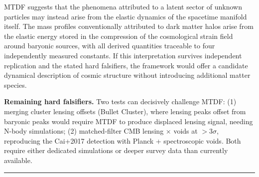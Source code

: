 \documentclass[11pt,a4paper]{article}
\begin{document}
MTDF suggests that the phenomena attributed to a latent sector of unknown particles may instead arise from the elastic dynamics of the spacetime manifold itself. The mass profiles conventionally attributed to dark matter halos arise from the elastic energy stored in the compression of the cosmological strain field around baryonic sources, with all derived quantities traceable to four independently measured constants. If this interpretation survives independent replication and the stated hard falsifiers, the framework would offer a candidate dynamical description of cosmic structure without introducing additional matter species.

\begin{mdframed}[linecolor=accent,linewidth=0.5pt,backgroundcolor=callout-bg,leftline=true,rightline=true,topline=true,bottomline=true,innerleftmargin=8pt,innerrightmargin=8pt,innertopmargin=6pt,innerbottommargin=6pt]
\textbf{Remaining hard falsifiers.} Two tests can decisively challenge MTDF: (1) merging cluster lensing offsets (Bullet Cluster), where lensing peaks offset from baryonic peaks would require MTDF to produce displaced lensing signal, needing N-body simulations; (2) matched-filter CMB lensing $\times$ voids at $> 3\sigma$, reproducing the Cai+2017 detection with Planck + spectroscopic voids. Both require either dedicated simulations or deeper survey data than currently available.
\end{mdframed}

\noindent\rule{\linewidth}{0.4pt}\par
\end{document}
